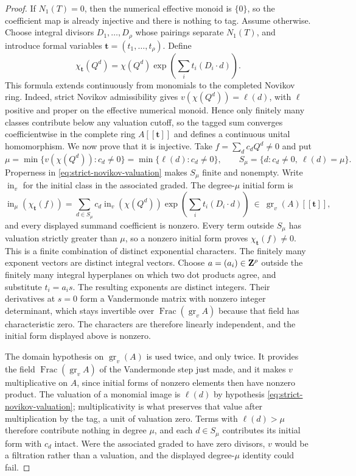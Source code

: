 \begin{proof}
If \(N_1(T)=0\), then the numerical effective monoid is \(\{0\}\), so the
coefficient map is already injective and there is nothing to tag.  Assume
otherwise.
Choose integral divisors \(D_1,\ldots,D_\rho\) whose pairings separate
\(N_1(T)\), and introduce formal variables
\(\boldsymbol t=(t_1,\ldots,t_\rho)\).  Define
\[
 \chi_{\boldsymbol t}(Q^d)=\chi(Q^d)
 \exp\!\left(\sum_i t_i(D_i\cdot d)\right).
 \label{eq:divisor-tagging-map}
\]
This formula extends continuously from monomials to the completed Novikov
ring.  Indeed, strict Novikov admissibility gives
\(v(\chi(Q^d))=\ell(d)\), with \(\ell\) positive and proper on the
effective numerical monoid.  Hence only finitely many classes contribute
below any valuation cutoff, so the tagged sum converges coefficientwise in
the complete ring \(A[[\boldsymbol t]]\) and defines a continuous unital
homomorphism.  We now prove that it is injective.  Take
\(f=\sum_d c_dQ^d\ne0\) and put
\[
 \mu=\min\{v(\chi(Q^d)):c_d\ne0\}
     =\min\{\ell(d):c_d\ne0\},
 \qquad
 S_\mu=\{d:c_d\ne0,\ \ell(d)=\mu\}.
 \label{eq:divisor-tagging-initial-support}
\]
Properness in \eqref{eq:strict-novikov-valuation} makes \(S_\mu\) finite
and nonempty.  Write \(\operatorname{in}_v\) for the initial class in the
associated graded.  The degree-\(\mu\) initial form is
\[
 \operatorname{in}_\mu\!\left(\chi_{\boldsymbol t}(f)\right)
 =\sum_{d\in S_\mu}c_d\operatorname{in}_v\!\left(\chi(Q^d)\right)
 \exp\!\left(\sum_i t_i(D_i\cdot d)\right)
 \ \in\ \operatorname{gr}_v(A)[[\boldsymbol t]],
 \label{eq:divisor-tagging-initial-form}
\]
and every displayed summand coefficient is nonzero.  Every term outside \(S_\mu\) has valuation
strictly greater than \(\mu\), so a nonzero initial form proves
\(\chi_{\boldsymbol t}(f)\ne0\).  This is a finite combination of distinct
exponential characters.  The finitely many exponent vectors are distinct
integral vectors.  Choose \(a=(a_i)\in\mathbf Z^\rho\) outside the finitely many
integral hyperplanes on which two dot products agree, and substitute
\(t_i=a_i s\).  The resulting exponents are distinct integers.  Their
derivatives at \(s=0\) form a Vandermonde matrix with nonzero integer
determinant, which stays invertible over
\(\operatorname{Frac}(\operatorname{gr}_v A)\) because that field has
characteristic zero.  The characters are therefore linearly independent, and
the initial form displayed above is nonzero.

The domain hypothesis on \(\operatorname{gr}_v(A)\) is used twice, and only
twice.  It provides the field \(\operatorname{Frac}(\operatorname{gr}_v A)\)
of the Vandermonde step just made, and it makes \(v\) multiplicative on
\(A\), since initial forms of nonzero elements then have nonzero product.  The
valuation of a monomial image is \(\ell(d)\) by hypothesis
\eqref{eq:strict-novikov-valuation}; multiplicativity is what preserves that
value after multiplication by the tag, a unit of valuation zero.  Terms with
\(\ell(d)>\mu\) therefore contribute nothing in degree \(\mu\), and each
\(d\in S_\mu\) contributes its initial form with \(c_d\) intact.  Were the
associated graded to have zero divisors, \(v\) would be a filtration rather
than a valuation, and the displayed degree-\(\mu\) identity could fail.


\end{proof}
